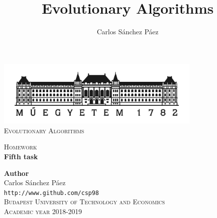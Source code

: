 \documentclass[12pt,english]{article}
\title{Evolutionary Algorithms}
\author{Carlos Sánchez Páez}
\begin{document}
\begin{titlepage}

\newlength{\centeroffset}
\setlength{\centeroffset}{-0.5\oddsidemargin}
\addtolength{\centeroffset}{0.5\evensidemargin}
\thispagestyle{empty}

\noindent\hspace*{\centeroffset}
\begin{minipage}{\textwidth}

\centering
\includegraphics[width=0.75\textwidth]{bme_logo.jpg}\\[1.4cm]

\textsc{ \Large Evolutionary Algorithms\\[4cm]}

\textsc{\Huge Homework}\\[0.75cm]

{\Large\bfseries Fifth task\\}
\end{minipage}

\vspace{8cm}
\noindent\hspace*{\centeroffset}
\begin{minipage}{\textwidth}
\centering

\textbf{Author}\\ {Carlos Sánchez Páez}\\
\texttt{http://www.github.com/csp98}\\[0.5cm]
\textsc{Budapest University of Technology and Economics}\\
\vspace{1cm}
\textsc{Academic year 2018-2019}
\end{minipage}
\end{titlepage}
\thispagestyle{empty}

\newpage
\end{document}
